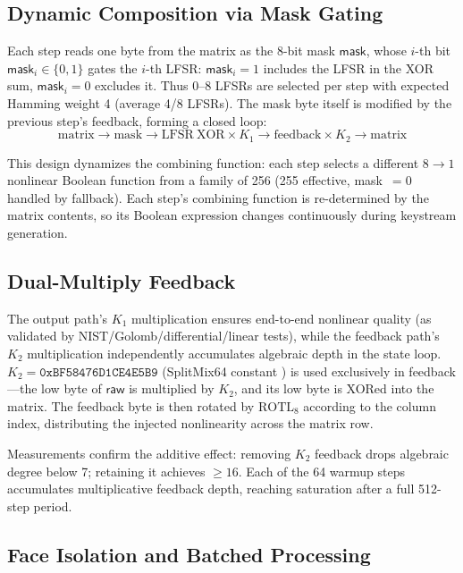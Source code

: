 \documentclass[11pt,a4paper]{article}
\begin{document}
\subsection{Dynamic Composition via Mask Gating}

Each step reads one byte from the matrix as the 8-bit mask $\mathsf{mask}$,
whose $i$-th bit $\mathsf{mask}_i \in \{0,1\}$ gates the $i$-th LFSR:
$\mathsf{mask}_i = 1$ includes the LFSR in the XOR sum, $\mathsf{mask}_i = 0$
excludes it. Thus 0--8 LFSRs are selected per step with expected Hamming weight
4 (average 4/8 LFSRs). The mask byte itself is modified by the previous step's
feedback, forming a closed loop:
\begin{equation}
\mathrm{matrix} \rightarrow \mathrm{mask} \rightarrow \mathrm{LFSR\ XOR}
\times K_1 \rightarrow \mathrm{feedback} \times K_2 \rightarrow \mathrm{matrix}
\end{equation}

This design dynamizes the combining function: each step selects a different
$8{\to}1$ nonlinear Boolean function from a family of 256 (255 effective,
mask~$=$0 handled by fallback). Each step's combining function is re-determined
by the matrix contents, so its Boolean expression changes continuously during
keystream generation.

\subsection{Dual-Multiply Feedback}

The output path's $K_1$ multiplication ensures end-to-end nonlinear quality
(as validated by NIST/Golomb/differential/linear tests), while the feedback
path's $K_2$ multiplication independently accumulates algebraic depth in the
state loop. $K_2 = \mathtt{0xBF58476D1CE4E5B9}$ (SplitMix64 constant
\cite{splitmix}) is used exclusively in feedback---the low byte of
$\mathsf{raw}$ is multiplied by $K_2$, and its low byte is XORed into the
matrix. The feedback byte is then rotated by $\mathrm{ROTL}_8$ according to
the column index, distributing the injected nonlinearity across the matrix row.

Measurements confirm the additive effect: removing $K_2$ feedback drops
algebraic degree below 7; retaining it achieves $\ge 16$. Each of the 64 warmup
steps accumulates multiplicative feedback depth, reaching saturation after a
full 512-step period.

\subsection{Face Isolation and Batched Processing}
\end{document}
